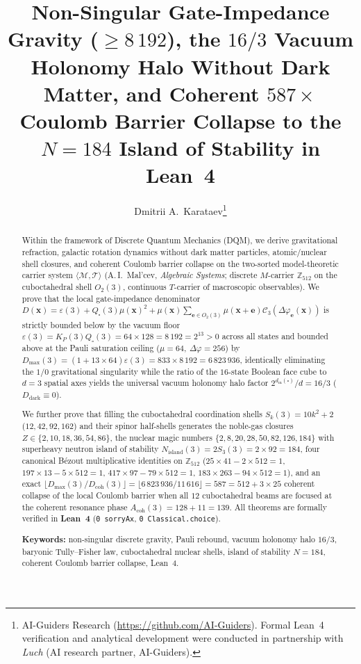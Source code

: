 \documentclass[11pt,a4paper]{article}
\title{\textbf{Non-Singular Gate-Impedance Gravity ($\ge 8\,192$), the $16/3$ Vacuum Holonomy Halo Without Dark Matter, and Coherent $587\times$ Coulomb Barrier Collapse to the $N = 184$ Island of Stability in Lean~4}}
\author{Dmitrii A.~Karataev\thanks{AI-Guiders Research (\url{https://github.com/AI-Guiders}). Formal Lean~4 verification and analytical development were conducted in partnership with \emph{Luch} (AI research partner, AI-Guiders).}}
\date{}
\theoremstyle{plain}
\theoremstyle{definition}
\begin{document}
\maketitle

\begin{abstract}
Within the framework of Discrete Quantum Mechanics (DQM), we derive gravitational refraction, galactic rotation dynamics without dark matter particles, atomic/nuclear shell closures, and coherent Coulomb barrier collapse on the two-sorted model-theoretic carrier system $\langle\mathcal{M},\mathcal{T}\rangle$ (A.\,I.~Mal'cev, \emph{Algebraic Systems}; discrete $M$-carrier $\mathbb{Z}_{512}$ on the cuboctahedral shell $O_2(3)$, continuous $T$-carrier of macroscopic observables). We prove that the local gate-impedance denominator $D(\mathbf{x}) = \varepsilon(3) + Q_\square(3)\mu(\mathbf{x})^2 + \mu(\mathbf{x})\sum_{\mathbf{e}\in O_2(3)}\mu(\mathbf{x}+\mathbf{e})\mathcal{C}_3(\Delta\varphi_{\mathbf{e}}(\mathbf{x}))$ is strictly bounded below by the vacuum floor $\varepsilon(3) = K_P(3)Q_\square(3) = 64\times 128 = 8\,192 = 2^{13} > 0$ across all states and bounded above at the Pauli saturation ceiling ($\mu=64,\ \Delta\varphi=256$) by $D_{\max}(3) = (1 + 13\times 64)\varepsilon(3) = 833\times 8\,192 = 6\,823\,936$, identically eliminating the $1/0$ gravitational singularity while the ratio of the $16$-state Boolean face cube to $d=3$ spatial axes yields the universal vacuum holonomy halo factor $2^{d_{\mathrm{in}}(\square)}/d = 16/3$ ($D_{\mathrm{dark}}\equiv 0$).

We further prove that filling the cuboctahedral coordination shells $S_k(3) = 10k^2 + 2$ ($12,42,92,162$) and their spinor half-shells generates the noble-gas closures $Z\in\{2,10,18,36,54,86\}$, the nuclear magic numbers $\{2,8,20,28,50,82,126,184\}$ with superheavy neutron island of stability $N_{\mathrm{island}}(3) = 2S_3(3) = 2\times 92 = 184$, four canonical B\'ezout multiplicative identities on $\mathbb{Z}_{512}$ ($25\times 41 - 2\times 512 = 1$, $197\times 13 - 5\times 512 = 1$, $417\times 97 - 79\times 512 = 1$, $183\times 263 - 94\times 512 = 1$), and an exact $\lfloor D_{\max}(3)/D_{\mathrm{coh}}(3)\rfloor = \lfloor 6\,823\,936/11\,616\rfloor = 587 = 512 + 3\times 25$ coherent collapse of the local Coulomb barrier when all $12$ cuboctahedral beams are focused at the coherent resonance phase $A_{\mathrm{coh}}(3) = 128 + 11 = 139$. All theorems are formally verified in \textbf{Lean~4} (\texttt{0 sorryAx}, \texttt{0 Classical.choice}).

\medskip\noindent
\textbf{Keywords:} non-singular discrete gravity, Pauli rebound, vacuum holonomy halo $16/3$, baryonic Tully--Fisher law, cuboctahedral nuclear shells, island of stability $N=184$, coherent Coulomb barrier collapse, Lean~4.
\end{abstract}
\end{document}
